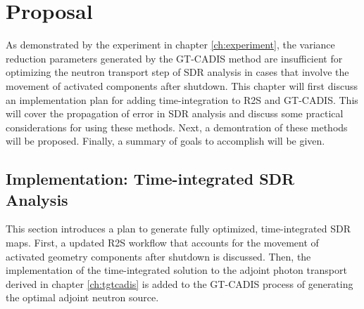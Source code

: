 \chapter{Proposal}\label{ch:proposal}

As demonstrated by the experiment in chapter \ref{ch:experiment},  the variance
reduction parameters generated by the GT-CADIS method are insufficient for
optimizing the neutron transport step of SDR analysis in cases that involve the movement 
of activated components after shutdown.  
This chapter will first discuss an implementation plan for adding
time-integration to R2S and GT-CADIS.  This will cover the propagation of error
in SDR analysis and discuss some practical considerations for
using these methods. 
Next, a demontration of these methods will be proposed.
Finally, a summary of goals to accomplish will be given.


\section{Implementation: Time-integrated SDR Analysis}\label{sec:implementation}

This section introduces a plan to generate fully optimized, time-integrated
SDR maps. First, a updated R2S workflow that accounts for the movement of
activated geometry components after shutdown is discussed.  Then, the implementation
of the time-integrated solution to the adjoint photon transport derived in
chapter \ref{ch:tgtcadis} is added to the GT-CADIS process of generating the
optimal adjoint neutron source. 




